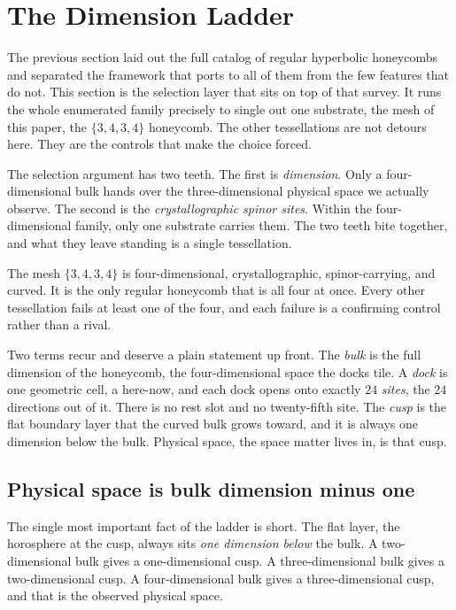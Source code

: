 \section{The Dimension Ladder}

The previous section laid out the full catalog of regular hyperbolic honeycombs and separated the framework that ports to all of them from the few features that do not. This section is the selection layer that sits on top of that survey. It runs the whole enumerated family precisely to single out one substrate, the mesh of this paper, the $\{3,4,3,4\}$ honeycomb. The other tessellations are not detours here. They are the controls that make the choice forced.

The selection argument has two teeth. The first is \emph{dimension}. Only a four-dimensional bulk hands over the three-dimensional physical space we actually observe. The second is the \emph{crystallographic spinor sites}. Within the four-dimensional family, only one substrate carries them. The two teeth bite together, and what they leave standing is a single tessellation.

\begin{result}
The mesh $\{3,4,3,4\}$ is four-dimensional, crystallographic, spinor-carrying, and curved. It is the only regular honeycomb that is all four at once. Every other tessellation fails at least one of the four, and each failure is a confirming control rather than a rival.
\end{result}

Two terms recur and deserve a plain statement up front. The \emph{bulk} is the full dimension of the honeycomb, the four-dimensional space the docks tile. A \emph{dock} is one geometric cell, a here-now, and each dock opens onto exactly $24$ \emph{sites}, the $24$ directions out of it. There is no rest slot and no twenty-fifth site. The \emph{cusp} is the flat boundary layer that the curved bulk grows toward, and it is always one dimension below the bulk. Physical space, the space matter lives in, is that cusp.

\subsection{Physical space is bulk dimension minus one}

The single most important fact of the ladder is short. The flat layer, the horosphere at the cusp, always sits \emph{one dimension below} the bulk. A two-dimensional bulk gives a one-dimensional cusp. A three-dimensional bulk gives a two-dimensional cusp. A four-dimensional bulk gives a three-dimensional cusp, and that is the observed physical space.

